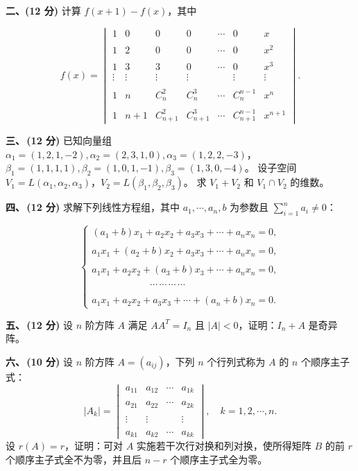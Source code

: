    \textbf{二、(12 分)} 计算 $f(x+1) - f(x)$，其中

\[
f(x) = \begin{vmatrix} 
1 & 0 & 0 & 0 & \cdots & 0 & x \\ \\
1 & 2 & 0 & 0 & \cdots & 0 & x^2 \\ \\
1 & 3 & 3 & 0 & \cdots & 0 & x^3 \\
\vdots & \vdots & \vdots & \vdots & & \vdots & \vdots \\ \\
1 & n & C_n^2 & C_n^3 & \cdots & C_n^{n-1} & x^n \\ \\
1 & n+1 & C_{n+1}^2 & C_{n+1}^3 & \cdots & C_{n+1}^{n-1} & x^{n+1}
\end{vmatrix}.
\]

\textbf{三、\,(12 分)}
已知向量组 $\alpha_1 = (1, 2, 1, -2), \alpha_2 = (2, 3, 1, 0), \alpha_3 = (1, 2, 2, -3)$，
$\beta_1 = (1, 1, 1, 1), \beta_2 = (1, 0, 1, -1), \beta_3 = (1, 3, 0, -4)$。
设子空间 $V_1 = L(\alpha_1, \alpha_2, \alpha_3)$，$V_2 = L(\beta_1, \beta_2, \beta_3)$。
求 $V_1 + V_2$ 和 $V_1 \cap V_2$ 的维数。

\textbf{四、\,(12 分)}
求解下列线性方程组，其中 $a_1, \cdots, a_n, b$ 为参数且 $\sum\limits_{i=1}^n a_i \neq 0$：

\[
\begin{cases} 
(a_1+b)x_1 + a_2x_2 + a_3x_3 + \cdots + a_nx_n = 0, \\ \\
a_1x_1 + (a_2+b)x_2 + a_3x_3 + \cdots + a_nx_n = 0, \\ \\
a_1x_1 + a_2x_2 + (a_3+b)x_3 + \cdots + a_nx_n = 0, \\ \\
\qquad\qquad\qquad\cdots\,\cdots\,\cdots\,\cdots \\ \\
a_1x_1 + a_2x_2 + a_3x_3 + \cdots + (a_n+b)x_n = 0.
\end{cases}
\]

\textbf{五、\,(12 分)}
设 $n$ 阶方阵 $A$ 满足 $AA^T = I_n$ 且 $|A| < 0$，证明：$I_n + A$ 是奇异阵。

\textbf{六、\,(10 分)}
设 $n$ 阶方阵 $A=(a_{ij})$，下列 $n$ 个行列式称为 $A$ 的 $n$ 个顺序主子式：
\[
|A_k| = \begin{vmatrix} 
a_{11} & a_{12} & \cdots & a_{1k} \\ \\
a_{21} & a_{22} & \cdots & a_{2k} \\ \\
\vdots & \vdots & & \vdots \\ \\
a_{k1} & a_{k2} & \cdots & a_{kk}
\end{vmatrix}, \quad k=1, 2, \cdots, n.
\]
设 $r(A)=r$，证明：可对 $A$ 实施若干次行对换和列对换，使所得矩阵 $B$ 的前 $r$ 个顺序主子式全不为零，并且后 $n-r$ 个顺序主子式全为零。

